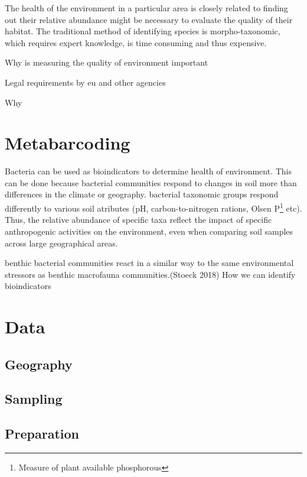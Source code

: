 The health of the environment in a particular area is closely related to finding out their relative abundance might be necessary to evaluate the quality of their habitat. The traditional method of identifying species is morpho-taxonomic, which requires expert knowledge, is time consuming and thus expensive. 

Why is measuring the quality of environment important

Legal requirements by eu and other agencies



Why

\section{Metabarcoding}
Bacteria can be used as bioindicators to determine health of environment. This can be done because bacterial communities respond to changes in soil more than differences in the climate or geography.  bacterial taxonomic groups respond differently to various soil atributes (pH, carbon-to-nitrogen rations, Olsen P\footnote{Measure of plant available phosphorous} etc). Thus, the relative abundance of specific taxa reflect the impact of specific anthropogenic activities on the environment, even when comparing soil samples across large geographical areas.\cite{hermans_bacteria_2016}

benthic bacterial communities react in a
similar way to the same environmental stressors as benthic macrofauna
communities.(Stoeck 2018)
How we can identify bioindicators 




\section{Data}
\subsection{Geography}
\subsection{Sampling}
\subsection{Preparation}
